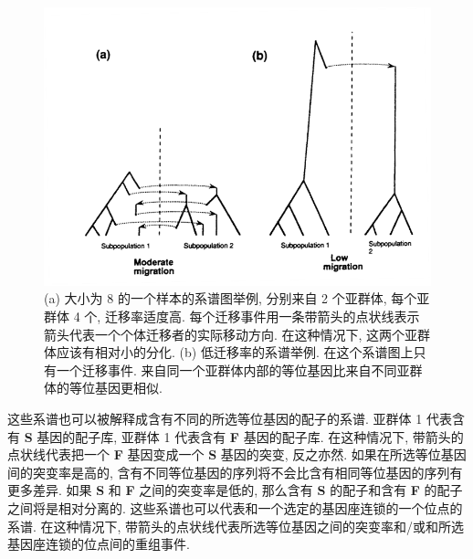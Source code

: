 \documentclass[12pt]{article}
\begin{document}
\begin{figure}
    \centering
    \includegraphics{coalescent-process.images/image6.png}
    \caption{
        (a) 大小为 8 的一个样本的系谱图举例, 分别来自 2 个亚群体, 每个亚群体 4 个, 迁移率适度高.
        每个迁移事件用一条带箭头的点状线表示箭头代表一个个体迁移者的实际移动方向. 在这种情况下, 这两个亚群体应该有相对小的分化.
        (b) 低迁移率的系谱举例. 在这个系谱图上只有一个迁移事件. 来自同一个亚群体内部的等位基因比来自不同亚群体的等位基因更相似.
    }
    \label{fig:6}
\end{figure}

这些系谱也可以被解释成含有不同的所选等位基因的配子的系谱. 亚群体 1 代表含有 \textbf{S} 基因的配子库, 亚群体 1 代表含有
\textbf{F} 基因的配子库. 在这种情况下, 带箭头的点状线代表把一个 \textbf{F} 基因变成一个 \textbf{S} 基因的突变,
反之亦然. 如果在所选等位基因间的突变率是高的, 含有不同等位基因的序列将不会比含有相同等位基因的序列有更多差异. 如果
\textbf{S} 和 \textbf{F} 之间的突变率是低的, 那么含有 \textbf{S} 的配子和含有 \textbf{F}
的配子之间将是相对分离的. 这些系谱也可以代表和一个选定的基因座连锁的一个位点的系谱. 在这种情况下,
带箭头的点状线代表所选等位基因之间的突变率和/或和所选基因座连锁的位点间的重组事件.
\end{document}
